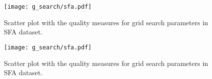 \begin{figure}[!htb]
    \centering
    \texttt{[image: g\_search/sfa.pdf]}

    \caption{Scatter plot with the quality measures for grid search parameters in SFA dataset.}
\end{figure}
\begin{figure}[!htb]
    \ContinuedFloat
    \centering
    \texttt{[image: g\_search/sfa.pdf]}

    \caption{Scatter plot with the quality measures for grid search parameters in SFA dataset.}
    \label{fig:sfa_g_search}
\end{figure}